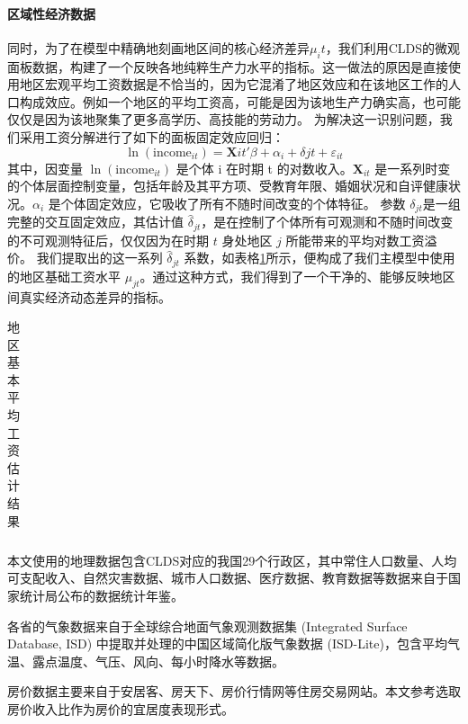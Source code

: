 \documentclass[
  a4paper,
  zihao=-4,
  fontset=mac,
  AutoFakeBold,
  AutoFakeSlant,
  oneside]{ctexbook}
\begin{document}
\paragraph{区域性经济数据}

同时，为了在模型中精确地刻画地区间的核心经济差异$\mu_it$，我们利用CLDS的微观面板数据，构建了一个反映各地纯粹生产力水平的指标。这一做法的原因是直接使用地区宏观平均工资数据是不恰当的，因为它混淆了地区效应和在该地区工作的人口构成效应。例如一个地区的平均工资高，可能是因为该地生产力确实高，也可能仅仅是因为该地聚集了更多高学历、高技能的劳动力。
为解决这一识别问题，我们采用工资分解进行了如下的面板固定效应回归：
\begin{equation}
\ln(\text{income}_{it}) = \mathbf{X}{it}'\beta + \alpha_i + \delta{jt} + \varepsilon_{it}
\label{eq:wage_decomposition}
\end{equation}
其中，因变量 $\ln(\text{income}_{it})$ 是个体 i 在时期 t 的对数收入。$\mathbf{X}_{it}$ 是一系列时变的个体层面控制变量，包括年龄及其平方项、受教育年限、婚姻状况和自评健康状况。$\alpha_i$ 是个体固定效应，它吸收了所有不随时间改变的个体特征。
参数 $\delta_{jt}$是一组完整的交互固定效应，其估计值 $\hat{\delta}_{jt}$，是在控制了个体所有可观测和不随时间改变的不可观测特征后，仅仅因为在时期 $t$ 身处地区 $j$ 所能带来的平均对数工资溢价。
我们提取出的这一系列 $\hat{\delta}_{jt}$ 系数，如表格\ref{tab:地区基本平均工资估计结果}所示，便构成了我们主模型中使用的地区基础工资水平 $\mu_{jt}$。通过这种方式，我们得到了一个干净的、能够反映地区间真实经济动态差异的指标。

\begin{table}[!ht]
\centering
\caption{地区基本平均工资估计结果}
\begin{tabularx}{\textwidth}{@{}cXXX@{}}
\toprule
\midrule
\bottomrule
\end{tabularx}
\label{tab:地区基本平均工资估计结果}
\end{table}





本文使用的地理数据包含CLDS对应的我国29个行政区，其中常住人口数量、人均可支配收入、自然灾害数据、城市人口数据、医疗数据、教育数据等数据来自于国家统计局公布的数据统计年鉴。

各省的气象数据来自于全球综合地面气象观测数据集 (Integrated Surface Database, ISD) 中提取并处理的中国区域简化版气象数据 (ISD-Lite)，包含平均气温、露点温度、气压、风向、每小时降水等数据。

房价数据主要来自于安居客、房天下、房价行情网等住房交易网站。本文参考\textcite{LiHuiFangJieFangJieShouRuBiYuLiuDongRenKouChangQiJuLiuYiYuanLaiZiLiuDongRenKouDeWeiGuanZhengJu2019}选取房价收入比作为房价的宜居度表现形式。
\end{document}
